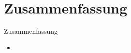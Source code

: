 \section{Zusammenfassung}
\begin{frame}{Zusammenfassung}
	\begin{itemize}
		\item 
	\end{itemize}
\end{frame}